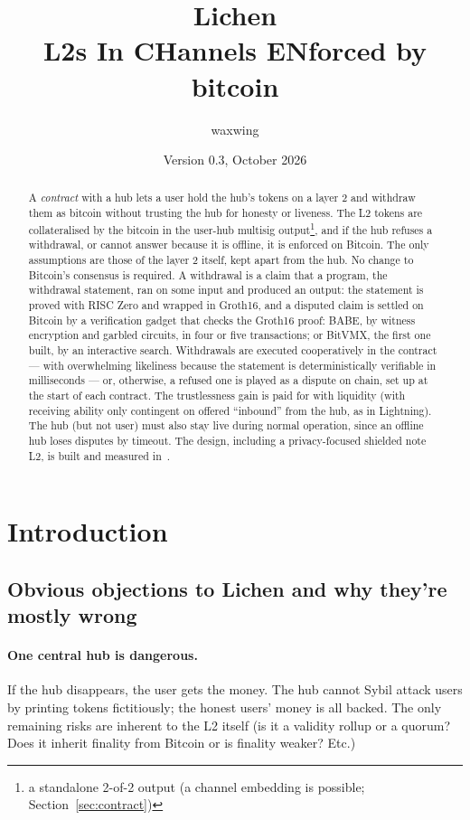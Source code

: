 \documentclass[11pt]{article}
\title{\textbf{Lichen}\\L2s In CHannels ENforced by bitcoin}
\author{waxwing}
\date{Version 0.3, October 2026}
\begin{document}
\maketitle

\begin{abstract}
A \emph{contract} with a hub lets a user hold the hub's tokens on a layer 2 and
withdraw them as bitcoin without trusting the hub for honesty or liveness. The L2 tokens are collateralised by the bitcoin in the user-hub multisig output\footnote{a standalone 2-of-2 output (a channel embedding is possible; Section~\ref{sec:contract})}, and if the hub refuses a withdrawal, or cannot answer because it is offline, it is enforced on Bitcoin. The only assumptions are those of the layer 2 itself, kept apart from the hub. No change to Bitcoin's
consensus is required. A withdrawal is a claim that a program, the withdrawal statement, ran on some input and produced an output: the statement is proved with RISC Zero and wrapped in Groth16, and a disputed claim is settled on Bitcoin by a verification gadget that checks the Groth16 proof: BABE, by witness encryption and garbled circuits, in four or five transactions; or BitVMX, the first one built, by an interactive search.  Withdrawals are executed cooperatively in the contract --- with overwhelming likeliness because the statement is deterministically verifiable in milliseconds --- or, otherwise, a refused one is played as a dispute on chain, set up at the start of each contract. The trustlessness gain is paid for with liquidity (with receiving ability only contingent on offered ``inbound'' from the hub, as in Lightning). The hub (but not user) must also stay live during normal operation, since an offline hub loses disputes by timeout. The design, including a privacy-focused shielded note L2, is built and measured in~\cite{lichencode}.
\end{abstract}

\tableofcontents

\section{Introduction}

\subsection{Obvious objections to Lichen and why they're mostly wrong}

\paragraph{One central hub is dangerous.} If the hub disappears, the user gets the money. The hub cannot Sybil attack users by printing tokens fictitiously; the honest users' money is all backed. The only remaining risks are inherent to the L2 itself (is it a validity rollup or a quorum? Does it inherit finality from Bitcoin or is finality weaker? Etc.)
\end{document}
